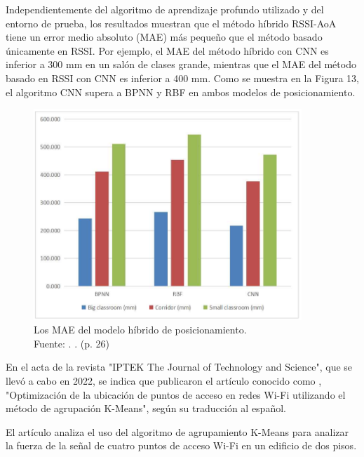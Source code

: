 Independientemente del algoritmo de aprendizaje profundo utilizado y del entorno de prueba, los resultados muestran que el método híbrido RSSI-AoA tiene un error medio absoluto (MAE) más pequeño que el método basado únicamente en RSSI. Por ejemplo, el MAE del método híbrido con CNN es inferior a 300 mm en un salón de clases grande, mientras que el MAE del método basado en RSSI con CNN es inferior a 400 mm. Como se muestra en la Figura 13, el algoritmo CNN supera a BPNN y RBF en ambos modelos de posicionamiento.

\begin{figure}[!ht]
	\begin{center}
		\includegraphics[width=0.90\textwidth]{2/figures/cai2023.png}
		\caption[Los MAE del modelo híbrido de posicionamiento]{Los MAE del modelo híbrido de posicionamiento.\\
			Fuente: \cite{pr_cai2023precisewifi}. . (p. 26)}
		\label{2:fig121}
	\end{center}
\end{figure}

En el acta de la revista "IPTEK The Journal of Technology and Science", que se llevó a cabo en 2022, se indica que \cite{pr_ainun2022optikmeans} publicaron el artículo conocido como , "Optimización de la ubicación de puntos de acceso en redes Wi-Fi utilizando el método de agrupación K-Means", según su traducción al español.

El artículo analiza el uso del algoritmo de agrupamiento K-Means para analizar la fuerza de la señal de cuatro puntos de acceso Wi-Fi en un edificio de dos pisos.

